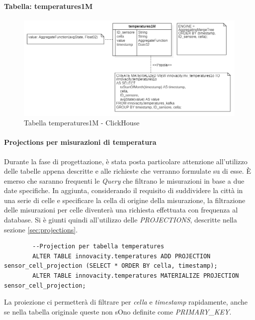     \paragraph{Tabella: temperatures1M}
    \begin{figure}[H]
        \centering
        \includegraphics[width=1\textwidth]{../Images/SpecificaTecnica/temperatures1Mese.PNG}
        \caption{Tabella temperatures1M - ClickHouse}
        \label{fig:temperatures1M}
        \end{figure}
    
    \paragraph{Projections per misurazioni di temperatura} \label{sec:temp_projections}
    Durante la fase di progettazione, è stata posta particolare attenzione all'utilizzo delle tabelle appena descritte e alle richieste che verranno formulate su di esse. È emerso che saranno frequenti le \textit{Query} che filtrano le misurazioni in base a due date specifiche.
    In aggiunta, considerando il requisito di suddividere la città in una serie di celle e specificare la cella di origine della misurazione, la filtrazione delle misurazioni per celle diventerà una richiesta effettuata con frequenza al database.
    Si è giunti quindi all'utilizzo delle \textit{PROJECTIONS}, descritte nella sezione \ref{sec:projections}.

    \begin{lstlisting}
        --Projection per tabella temperatures
        ALTER TABLE innovacity.temperatures ADD PROJECTION sensor_cell_projection (SELECT * ORDER BY cella, timestamp);
        ALTER TABLE innovacity.temperatures MATERIALIZE PROJECTION sensor_cell_projection;
    \end{lstlisting}

    La proiezione ci permetterà di filtrare per \textit{cella} e \textit{timestamp} rapidamente, anche se nella tabella originale queste non sOno definite come \textit{PRIMARY\_KEY}.

